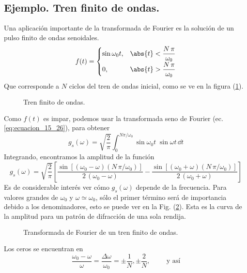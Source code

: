 \subsection*{Ejemplo. Tren finito de ondas.}
Una aplicación importante de la transformada de Fourier es la solución de un pulso finito de ondas senoidales.
\begin{equation}
f(t) = \begin{cases}
\sin \omega_{0} t, & \abs{t} < \dfrac{N \, \pi}{\omega_{0}} \\[0.5em]
0, & \abs{t} > \dfrac{N \, \pi}{\omega_{0}}
\end{cases}
\label{eq_ecuacion_15_28}
\end{equation}
Que corresponde a $N$ ciclos del tren de ondas inicial, como se ve en la figura (\ref{fig:tren_finito}).
\begin{figure}[H]
\centering

\caption{Tren finito de ondas.}
\label{fig:tren_finito}
\end{figure}
Como $f(t)$ es impar, podemos usar la transformada seno de Fourier (ec. \ref{eq:ecuacion_15_26}), para obtener
\begin{equation}
g_{s} (\omega) = \sqrt{\dfrac{2}{\pi}} \int_{0}^{N \pi / \omega_{0}} \sin \omega_{0} t \; \sin \omega t \, \dd t
\label{eq:ecuacion_15_29}
\end{equation}
Integrando, encontramos la amplitud de la función
\begin{equation}
g_{s} (\omega) = \sqrt{\dfrac{2}{\pi}} \left[ \dfrac{\sin[(\omega_{0} - \omega)(N  \, \pi / \omega_{0})]}{2 \, (\omega_{0} - \omega)} - \dfrac{\sin[(\omega_{0} + \omega)(N \, \pi / \omega_{0})]}{2 \, (\omega_{0} + \omega)} \right]
\label{eq:ecuacion_15_30}
\end{equation}
Es de considerable interés ver cómo $g_{s} (\omega)$ depende de la frecuencia. Para valores grandes de $\omega_{0}$ y $\omega \simeq \omega_{0}$, sólo el primer término será de importancia debido a los denominadores, esto se puede ver en la Fig. (\ref{fig:TF_tren_finito}). Esta es la curva de la amplitud para un patrón de difracción de una sola rendija.
\begin{figure}[H]
    \centering
    
    \caption{Transformada de Fourier de un tren finito de ondas.}
    \label{fig:TF_tren_finito}
\end{figure}
Los ceros se encuentran en
\begin{equation}
\dfrac{ \omega_{0} - \omega}{\omega} = \dfrac{\Delta \omega}{\omega_{0}} = \pm \dfrac{1}{N}, \pm \dfrac{2}{N}, \hspace{1cm} \text{y así}
\label{eq:ecuacion_15_31}
\end{equation}
